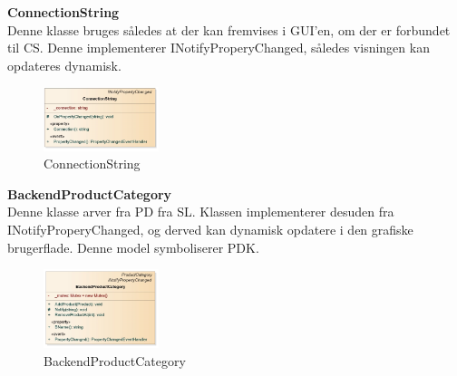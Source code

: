  
  \textbf{ConnectionString}\\
Denne klasse bruges således at der kan fremvises i GUI'en, om der er forbundet til \gls{CS}. Denne implementerer INotifyProperyChanged, således visningen kan opdateres dynamisk.
\begin{center}
\begin{figure}[!h]
    \centering
    \includegraphics[width=0.30\textwidth]{Systemdesign/backend/klassebeskrivelser/Images/const.png}
    \caption{ConnectionString}
    \label{fig:ConnectionString}
\end{figure}
\end{center}
\label{ConnectionString_Beskrivelse}
 \bigskip 


 \textbf{BackendProductCategory}\\
Denne klasse arver fra \gls{PD} fra \gls{SL}. Klassen implementerer desuden fra INotifyProperyChanged, og derved kan dynamisk opdatere i den grafiske brugerflade. Denne model symboliserer \gls{PDK}.
\begin{center}
\begin{figure}[!h]
    \centering
    \includegraphics[width=0.30\textwidth]{Systemdesign/backend/klassebeskrivelser/Images/Backendproductcat.png}
    \caption{BackendProductCategory}
    \label{fig:BackendProductCategory}
\end{figure}
\end{center}
\label{BackendProductCategoryr_Beskrivelse}
 \bigskip 

